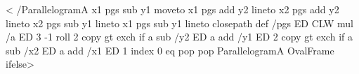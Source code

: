 <{%
  /ParallelogramA {
  x1 pgs sub y1 moveto
  x1 pgs add y2 lineto
  x2 pgs add y2 lineto
  x2 pgs sub y1 lineto
  x1 pgs sub y1 lineto
  closepath} def
%
/pgs ED
CLW mul
/a ED
3 -1 roll
2 copy gt { exch } if
a sub
/y2 ED
a add
/y1 ED
2 copy gt { exch } if
a sub
/x2 ED
a add
/x1 ED
1 index 0 eq {pop pop ParallelogramA } { OvalFrame } ifelse}>
%
\def\parseRP#1;#2;#3\@nil{%
  \def\arg@A{#1}\def\arg@B{#2}}
%
\def\Put{\pst@object{Put}}%
\def\Put@i{\@ifnextchar({\Put@ii{}}{\Put@ii}}%
\def\Put@ii#1(#2)#3{{%
  \pst@killglue
  \use@par
  \expandafter\parseRP#1;;\@nil%
  \ifx\arg@B\@empty%
    \edef\arg@A{\if@star*\fi\ifx\arg@A\@empty\else[\arg@A]\fi}%
    \expandafter\rput\arg@A(>#2){#3}
  \else%
    \edef\arg@A{\if@star*\fi%
      \ifx\arg@A\@empty\else{\arg@A}\fi%
      \ifx\arg@B\@empty[0]\else[\arg@B]\fi}%
    \expandafter\uput\arg@A(>#2){#3}
  \fi}\ignorespaces}%

